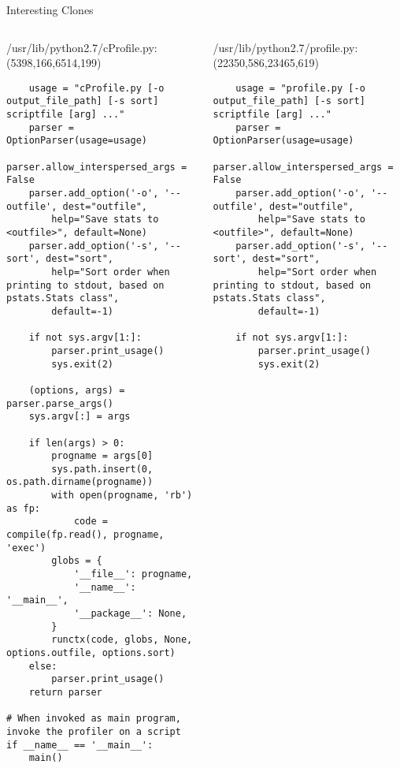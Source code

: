 \begin{frame}[shrink=35,fragile]{Interesting Clones}

\lstset{
    breaklines=true,
    language=Python
}

\begin{columns}
\begin{column}[t]{0.48\textwidth}
/usr/lib/python2.7/cProfile.py:(5398,166,6514,199)
\begin{lstlisting}
    usage = "cProfile.py [-o output_file_path] [-s sort] scriptfile [arg] ..."
    parser = OptionParser(usage=usage)
    parser.allow_interspersed_args = False
    parser.add_option('-o', '--outfile', dest="outfile",
        help="Save stats to <outfile>", default=None)
    parser.add_option('-s', '--sort', dest="sort",
        help="Sort order when printing to stdout, based on pstats.Stats class",
        default=-1)

    if not sys.argv[1:]:
        parser.print_usage()
        sys.exit(2)

    (options, args) = parser.parse_args()
    sys.argv[:] = args

    if len(args) > 0:
        progname = args[0]
        sys.path.insert(0, os.path.dirname(progname))
        with open(progname, 'rb') as fp:
            code = compile(fp.read(), progname, 'exec')
        globs = {
            '__file__': progname,
            '__name__': '__main__',
            '__package__': None,
        }
        runctx(code, globs, None, options.outfile, options.sort)
    else:
        parser.print_usage()
    return parser

# When invoked as main program, invoke the profiler on a script
if __name__ == '__main__':
    main()
\end{lstlisting}
\end{column}

\begin{column}[t]{0.48\textwidth}
/usr/lib/python2.7/profile.py:(22350,586,23465,619)
\begin{lstlisting}
    usage = "profile.py [-o output_file_path] [-s sort] scriptfile [arg] ..."
    parser = OptionParser(usage=usage)
    parser.allow_interspersed_args = False
    parser.add_option('-o', '--outfile', dest="outfile",
        help="Save stats to <outfile>", default=None)
    parser.add_option('-s', '--sort', dest="sort",
        help="Sort order when printing to stdout, based on pstats.Stats class",
        default=-1)

    if not sys.argv[1:]:
        parser.print_usage()
        sys.exit(2)


\end{lstlisting}
\end{column}
\end{columns}
\end{frame}
